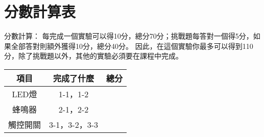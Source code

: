 \documentclass[12pt,a4paper]{article}
\begin{document}
\section{分數計算表}

分數計算：
每完成一個實驗可以得10分，總分70分；挑戰題每答對一個得5分，如果全部答對則額外獲得10分，總分40分。
因此，在這個實驗你最多可以得到110分，除了挑戰題以外，其他的實驗必須要在課程中完成。

\begin{table}[h!]
\centering
\begin{tabular}{|c|c|>{\centering\arraybackslash}p{3cm}|}
\hline
項目 & 完成了什麼 & 總分 \\ \hline
LED燈 & 1-1，1-2  &  \\ \hline
蜂鳴器 &  2-1，2-2 &  \\ \hline
觸控開關 & 3-1，3-2，3-3 &  \\ \hline
\end{tabular}
\end{table}
\end{document}

